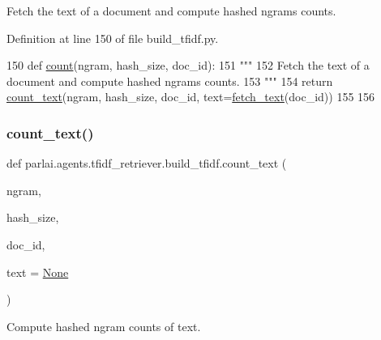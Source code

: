 \begin{DoxyVerb}Fetch the text of a document and compute hashed ngrams counts.
\end{DoxyVerb}
 

Definition at line 150 of file build\+\_\+tfidf.\+py.


\begin{DoxyCode}
150 \textcolor{keyword}{def }\hyperlink{namespaceparlai_1_1agents_1_1tfidf__retriever_1_1build__tfidf_a7fc352c82f4a875b23fec3b046027039}{count}(ngram, hash\_size, doc\_id):
151     \textcolor{stringliteral}{"""}
152 \textcolor{stringliteral}{    Fetch the text of a document and compute hashed ngrams counts.}
153 \textcolor{stringliteral}{    """}
154     \textcolor{keywordflow}{return} \hyperlink{namespaceparlai_1_1agents_1_1tfidf__retriever_1_1build__tfidf_a76bae1c966a21d123cb91949d6c8ec20}{count\_text}(ngram, hash\_size, doc\_id, text=\hyperlink{namespaceparlai_1_1agents_1_1tfidf__retriever_1_1build__tfidf_a8f16fdf4641c497d12c19f128ed4647a}{fetch\_text}(doc\_id))
155 
156 
\end{DoxyCode}
\mbox{\label{namespaceparlai_1_1agents_1_1tfidf__retriever_1_1build__tfidf_a76bae1c966a21d123cb91949d6c8ec20}} 
\subsubsection{\texorpdfstring{count\+\_\+text()}{count\_text()}}
{\footnotesize\ttfamily def parlai.\+agents.\+tfidf\+\_\+retriever.\+build\+\_\+tfidf.\+count\+\_\+text (\begin{DoxyParamCaption}\item[{}]{ngram,  }\item[{}]{hash\+\_\+size,  }\item[{}]{doc\+\_\+id,  }\item[{}]{text = {\ttfamily \hyperlink{namespaceparlai_1_1agents_1_1tfidf__retriever_1_1build__tfidf_ad50f77b70c0e27d3304395c58e9212c4}{None}} }\end{DoxyParamCaption})}

\begin{DoxyVerb}Compute hashed ngram counts of text.
\end{DoxyVerb}
 

